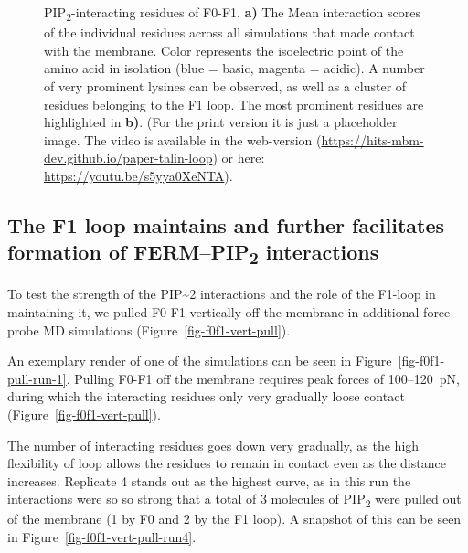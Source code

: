 \documentclass[
  twocolumn]{biophys-new-mod}
\begin{document}
\begin{figure}
\begin{minipage}[t]{\linewidth}
{}

\subcaption{\label{fig-f1f1-residues}~}
\end{minipage}%

\caption{\label{fig-f0f1-residues}PIP\textsubscript{2}-interacting
residues of F0-F1. \textbf{a)} The Mean interaction scores of the
individual residues across all simulations that made contact with the
membrane. Color represents the isoelectric point of the amino acid in
isolation (blue = basic, magenta = acidic). A number of very prominent
lysines can be observed, as well as a cluster of residues belonging to
the F1 loop. The most prominent residues are highlighted in \textbf{b)}.
(For the print version it is just a placeholder image. The video is
available in the web-version
(\url{https://hits-mbm-dev.github.io/paper-talin-loop}) or here:
\url{https://youtu.be/s5yya0XeNTA}).}

\end{figure}

\hypertarget{the-f1-loop-maintains-and-further-facilitates-formation-of-fermpip2-interactions}{%
\subsection{\texorpdfstring{The F1 loop maintains and further
facilitates formation of FERM--PIP\textsubscript{2}
interactions}{The F1 loop maintains and further facilitates formation of FERM--PIP2 interactions}}\label{the-f1-loop-maintains-and-further-facilitates-formation-of-fermpip2-interactions}}

To test the strength of the PIP\textasciitilde2 interactions and the
role of the F1-loop in maintaining it, we pulled F0-F1 vertically off
the membrane in additional force-probe MD simulations
(Figure~\ref{fig-f0f1-vert-pull}).

An exemplary render of one of the simulations can be seen in
Figure~\ref{fig-f0f1-pull-run-1}. Pulling F0-F1 off the membrane
requires peak forces of 100--120~pN, during which the interacting
residues only very gradually loose contact
(Figure~\ref{fig-f0f1-vert-pull}).

The number of interacting residues goes down very gradually, as the high
flexibility of loop allows the residues to remain in contact even as the
distance increases. Replicate 4 stands out as the highest curve, as in
this run the interactions were so so strong that a total of 3 molecules
of PIP\textsubscript{2} were pulled out of the membrane (1 by F0 and 2
by the F1 loop). A snapshot of this can be seen in
Figure~\ref{fig-f0f1-vert-pull-run4}.
\end{document}
